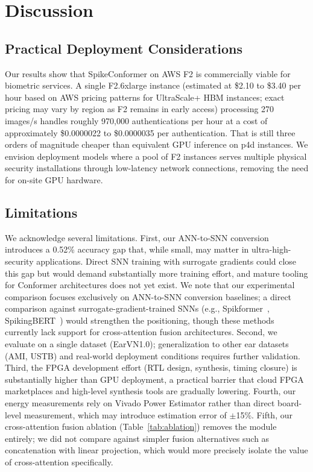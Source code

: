 \documentclass[11pt,a4paper]{article}
\begin{document}
\section{Discussion}\label{sec:discussion}

\subsection{Practical Deployment Considerations}

Our results show that SpikeConformer on AWS F2 is commercially viable for biometric services. A single F2.6xlarge instance (estimated at \$2.10 to \$3.40 per hour based on AWS pricing patterns for UltraScale+ HBM instances; exact pricing may vary by region as F2 remains in early access) processing 270 images/s handles roughly 970,000 authentications per hour at a cost of approximately \$0.0000022 to \$0.0000035 per authentication. That is still three orders of magnitude cheaper than equivalent GPU inference on p4d instances. We envision deployment models where a pool of F2 instances serves multiple physical security installations through low-latency network connections, removing the need for on-site GPU hardware.

\subsection{Limitations}

We acknowledge several limitations. First, our ANN-to-SNN conversion introduces a 0.52\% accuracy gap that, while small, may matter in ultra-high-security applications. Direct SNN training with surrogate gradients could close this gap but would demand substantially more training effort, and mature tooling for Conformer architectures does not yet exist. We note that our experimental comparison focuses exclusively on ANN-to-SNN conversion baselines; a direct comparison against surrogate-gradient-trained SNNs (e.g., Spikformer~\cite{zhou2023spikformer}, SpikingBERT~\cite{bal2024spikingbert}) would strengthen the positioning, though these methods currently lack support for cross-attention fusion architectures. Second, we evaluate on a single dataset (EarVN1.0); generalization to other ear datasets (AMI, USTB) and real-world deployment conditions requires further validation. Third, the FPGA development effort (RTL design, synthesis, timing closure) is substantially higher than GPU deployment, a practical barrier that cloud FPGA marketplaces and high-level synthesis tools are gradually lowering. Fourth, our energy measurements rely on Vivado Power Estimator rather than direct board-level measurement, which may introduce estimation error of $\pm$15\%. Fifth, our cross-attention fusion ablation (Table~\ref{tab:ablation}) removes the module entirely; we did not compare against simpler fusion alternatives such as concatenation with linear projection, which would more precisely isolate the value of cross-attention specifically.
\end{document}
